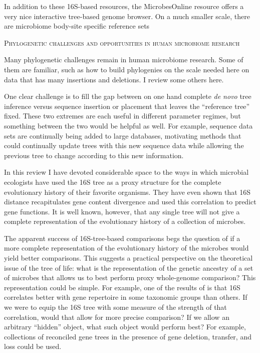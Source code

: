 \documentclass{amsart}
\renewcommand{\section}[1]{%
\bigskip
\begin{center}
\begin{Large}
\normalfont\scshape #1
\medskip
\end{Large}
\end{center}}
\begin{document}
In addition to these 16S-based resources, the MicrobesOnline resource \citep{dehal2010microbesonline} offers a very nice interactive tree-based genome browser.
On a much smaller scale, there are microbiome body-site specific reference sets \citep{chen2010human,griffen2011core,srinivasan2012bacterial}



\section{Phylogenetic challenges and opportunities in human microbiome research}

Many phylogenetic challenges remain in human microbiome research.
Some of them are familiar, such as how to build phylogenies on the scale needed here on data that has many insertions and deletions.
I review some others here.

One clear challenge is to fill the gap between on one hand complete \emph{de novo} tree inference versus sequence insertion or placement that leaves the ``reference tree'' fixed.
These two extremes are each useful in different parameter regimes, but something between the two would be helpful as well.
For example, sequence data sets are continually being added to large databases, motivating methods that could continually update trees with this new sequence data while allowing the previous tree to change according to this new information.

In this review I have devoted considerable space to the ways in which microbial ecologists have used the 16S tree as a proxy structure for the complete evolutionary history of their favorite organisms.
They have even shown that 16S distance recapitulates gene content divergence and used this correlation to predict gene functions.
It is well known, however, that any single tree will not give a complete representation of the evolutionary history of a collection of microbes.

The apparent success of 16S-tree-based comparisons begs the question of if a more complete representation of the evolutionary history of the microbes would yield better comparisons.
This suggests a practical perspective on the theoretical issue of the tree of life: what is the representation of the genetic ancestry of a set of microbes that allows us to best perform proxy whole-genome comparison?
This representation could be simple.
For example, one of the results of \citet{zaneveld2010ribosomal} is that 16S correlates better with gene repertoire in some taxonomic groups than others.
If we were to equip the 16S tree with some measure of the strength of that correlation, would that allow for more precise comparison?
If we allow an arbitrary ``hidden'' object, what such object would perform best?
For example, collections of reconciled gene trees in the presence of gene deletion, transfer, and loss \citep[see][for interesting recent results]{szollHosi2013efficient,szollHosi2013lateral} could be used.
\end{document}
